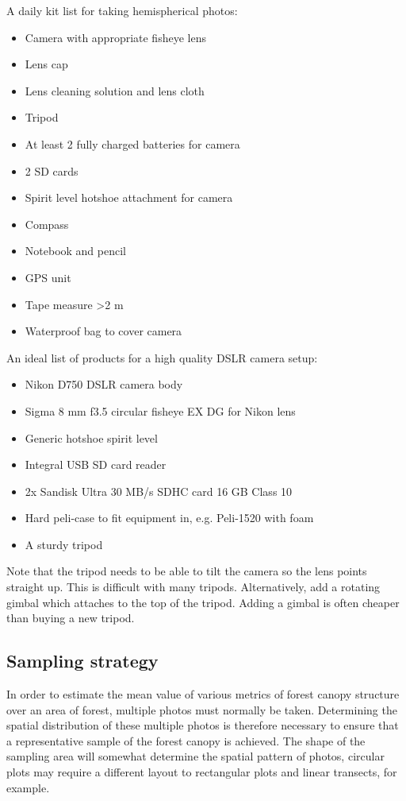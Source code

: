 \documentclass[11pt,a4paper]{article}
\begin{document}
A daily kit list for taking hemispherical photos:

\begin{itemize}
	\item{Camera with appropriate fisheye lens}
	\item{Lens cap}
	\item{Lens cleaning solution and lens cloth}
	\item{Tripod}
	\item{At least 2 fully charged batteries for camera}
	\item{2 SD cards}
	\item{Spirit level hotshoe attachment for camera}
	\item{Compass}
	\item{Notebook and pencil}
	\item{GPS unit}
	\item{Tape measure >2 m}
	\item{Waterproof bag to cover camera}
\end{itemize}

An ideal list of products for a high quality DSLR camera setup:

\begin{itemize}
	\item{Nikon D750 DSLR camera body}
	\item{Sigma 8 mm f3.5 circular fisheye EX DG for Nikon lens}
	\item{Generic hotshoe spirit level}
	\item{Integral USB SD card reader}
	\item{2x Sandisk Ultra 30 MB/s SDHC card 16 GB Class 10}
	\item{Hard peli-case to fit equipment in, e.g. Peli-1520 with foam}
	\item{A sturdy tripod}
\end{itemize}

Note that the tripod needs to be able to tilt the camera so the lens points straight up. This is difficult with many tripods. Alternatively, add a rotating gimbal which attaches to the top of the tripod. Adding a gimbal is often cheaper than buying a new tripod.

\subsection{Sampling strategy}

In order to estimate the mean value of various metrics of forest canopy structure over an area of forest, multiple photos must normally be taken. Determining the spatial distribution of these multiple photos is therefore necessary to ensure that a representative sample of the forest canopy is achieved. The shape of the sampling area will somewhat determine the spatial pattern of photos, circular plots may require a different layout to rectangular plots and linear transects, for example.
\end{document}
